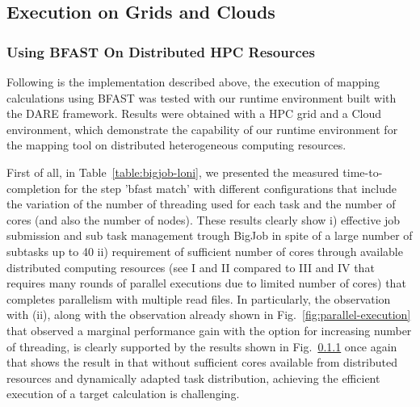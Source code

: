 \documentclass{acm_proc_article-sp}
\begin{document}
\subsection{Execution on Grids and Clouds}

\subsubsection{Using BFAST On Distributed HPC Resources}

Following is the implementation described above, the execution of
mapping calculations using BFAST was tested with our runtime
environment built with the DARE framework.  Results were obtained with
a HPC grid and a Cloud environment, which demonstrate the capability
of our runtime environment for the mapping tool on distributed
heterogeneous computing resources. 

First of all, in Table~\ref{table:bigjob-loni}, we presented the
measured time-to-completion for the step 'bfast match' with different
configurations that include the variation of the number of threading
used for each task and the number of cores (and also the number of
nodes).  These results clearly show i) effective job submission and
sub task management trough BigJob in spite of a large number of
subtasks up to 40 ii) requirement of sufficient number of cores
through available distributed computing resources (see I and II
compared to III and IV that requires many rounds of parallel
executions due to limited number of cores) that completes parallelism
with multiple read files.  In particularly, the observation with (ii),
along with the observation already shown in
Fig.~\ref{fig:parallel-execution} that observed a marginal performance
gain with the option for increasing number of threading, is clearly
supported by the results shown in Fig.~\ref{} once again that shows
the result in that without sufficient cores available from distributed
resources and dynamically adapted task distribution, achieving the
efficient execution of a target calculation is challenging.
\end{document}
